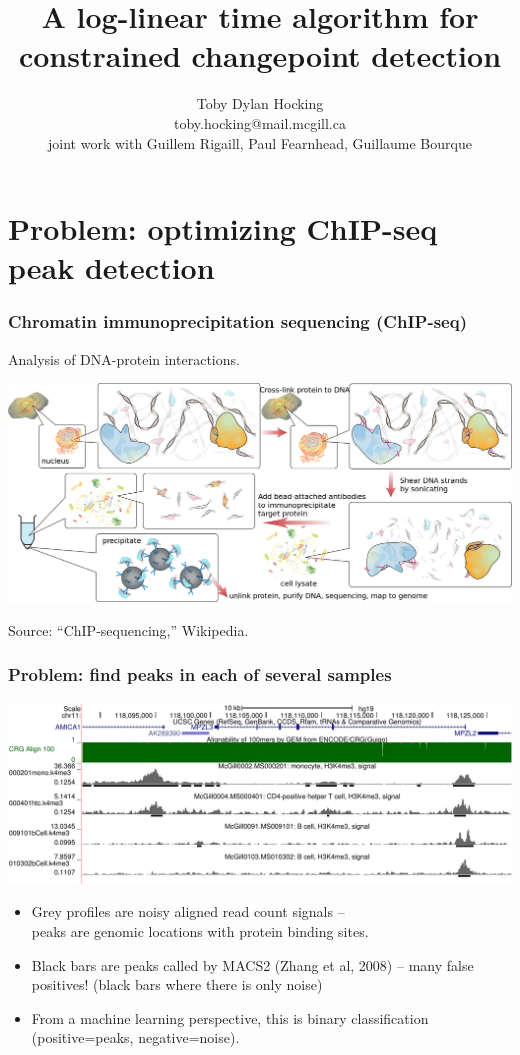 \documentclass{beamer}
\begin{document}
\title{A log-linear time algorithm for constrained 
changepoint detection}

\author{
  Toby Dylan Hocking\\
  toby.hocking@mail.mcgill.ca\\
  joint work with Guillem Rigaill, Paul Fearnhead, 
  Guillaume Bourque}


\maketitle

\section{Problem: optimizing ChIP-seq peak detection}

\begin{frame}
  \frametitle{Chromatin immunoprecipitation sequencing (ChIP-seq)}
  Analysis of DNA-protein interactions.

  \includegraphics[width=\textwidth]{Chromatin_immunoprecipitation_sequencing_wide.png}

  Source: ``ChIP-sequencing,'' Wikipedia.
\end{frame}

\begin{frame}
  \frametitle{Problem: find peaks in each of several samples}
  \includegraphics[width=\textwidth]{screenshot-ucsc-edited}

  \begin{itemize}
  \item Grey profiles are noisy aligned read count signals -- \\peaks
    are genomic locations with protein binding sites.
  \item Black bars are peaks called by MACS2 (Zhang et al, 2008) -- many
    false positives! (black bars where there is only noise)
  \item From a machine learning perspective, this is binary
    classification (positive=peaks, negative=noise).
  \end{itemize}
\end{frame}
\end{document}
